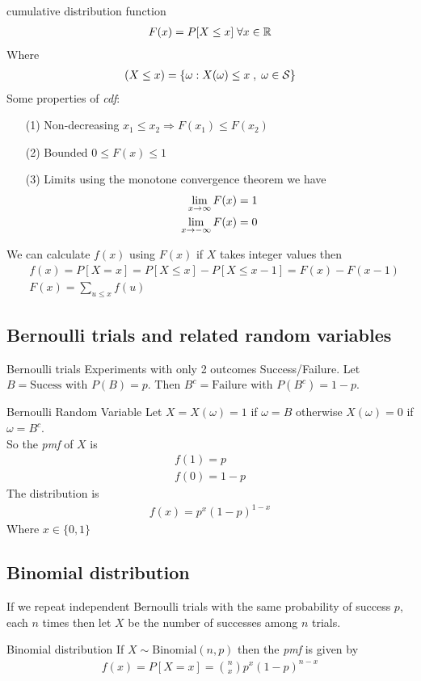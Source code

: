 \documentclass[16pt,a4paper]{article}
\begin{document}
\newpage
\begin{defn}{cumulative distribution function}
\begin{align*}
F(x) = P[X\leq x] \; \forall x \in \mathbb{R}
\end{align*}
Where 
\begin{align*}
(X\leq x) = \{\omega : X(\omega) \leq x \; ,\; \omega \in \cal S\}
\end{align*}
Some properties of \textit{cdf}:
\begin{enumerate}
\item[(1)] Non-decreasing $x_1 \leq x_2 \Rightarrow F(x_1) \leq F(x_2)$
\item[(2)] Bounded $0\leq F(x) \leq 1$
\item[(3)] Limits using the monotone convergence theorem we have 
\begin{align*}
\lim\limits_{x \rightarrow \infty} F(x) = 1\\
\lim\limits_{x \rightarrow -\infty} F(x) = 0
\end{align*}
\end{enumerate}
\end{defn}
We can calculate $f(x)$ using $F(x)$ if $X$ takes integer values then 
\begin{align*}
&f(x) = P[X=x] = P[X\leq x]-P[X\leq x-1] = F(x) - F(x-1)\\
&F(x) = \sum_{u\leq x}f(u)
\end{align*} 
\newpage
\subsection{Bernoulli trials and related random variables}
\begin{defn}{Bernoulli trials}
Experiments with only 2 outcomes Success/Failure. 
Let $B = \text{Sucess}$ with $P(B) = p$. Then $B^c = \text{Failure}$ with $P(B^c) = 1-p$. 
\end{defn}
\begin{defn}{Bernoulli Random Variable}
Let $X = X(\omega) = 1$ if $\omega = B$ otherwise $X(\omega) = 0$ if $\omega = B^c$. 
\\
So the \textit{pmf} of $X$ is 
\begin{align*}
f(1) = p\\
f(0) = 1-p
\end{align*}
The distribution is 
\begin{align*}
f(x) = p^x(1-p)^{1-x}
\end{align*}
Where $x\in \{0,1\}$
\end{defn}
\subsection{Binomial distribution}
If we repeat independent Bernoulli trials with the same probability of success $p$, each $n$ times then let $X$ be the number of successes among $n$ trials. 
\begin{thm}{Binomial distribution}
If $X\sim \text{Binomial}(n,p)$ then the \textit{pmf} is given by 
\begin{align*}
f(x) = P[X=x] = {n\choose x}p^x(1-p)^{n-x}
\end{align*}
\end{thm}
\newpage
\end{document}
